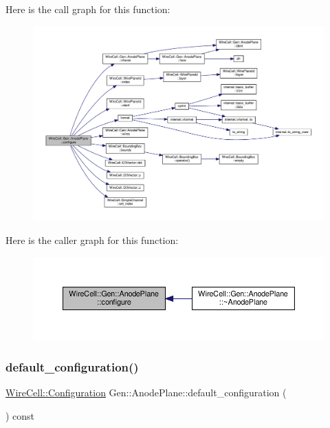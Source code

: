 Here is the call graph for this function\+:
\nopagebreak
\begin{figure}[H]
\begin{center}
\leavevmode
\includegraphics[width=350pt]{class_wire_cell_1_1_gen_1_1_anode_plane_a2d1c7a1dded73fe3b51cbcfb8d9e0e04_cgraph}
\end{center}
\end{figure}
Here is the caller graph for this function\+:
\nopagebreak
\begin{figure}[H]
\begin{center}
\leavevmode
\includegraphics[width=350pt]{class_wire_cell_1_1_gen_1_1_anode_plane_a2d1c7a1dded73fe3b51cbcfb8d9e0e04_icgraph}
\end{center}
\end{figure}
\mbox{\label{class_wire_cell_1_1_gen_1_1_anode_plane_acc2e184daee40976feb1b2a1b6171905}} 
\subsubsection{\texorpdfstring{default\+\_\+configuration()}{default\_configuration()}}
{\footnotesize\ttfamily \hyperlink{namespace_wire_cell_a9f705541fc1d46c608b3d32c182333ee}{Wire\+Cell\+::\+Configuration} Gen\+::\+Anode\+Plane\+::default\+\_\+configuration (\begin{DoxyParamCaption}{ }\end{DoxyParamCaption}) const\hspace{0.3cm}{\ttfamily [virtual]}}




